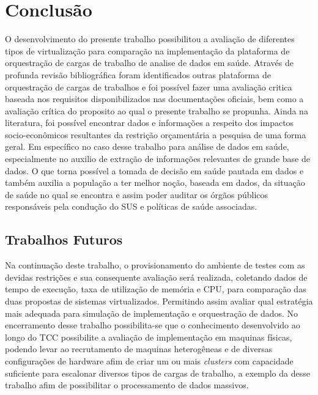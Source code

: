
\chapter{Conclusão}
\label{chap:conclusao}

O desenvolvimento do presente trabalho possibilitou a avaliação de diferentes tipos de virtualização para comparação na implementação da plataforma de orquestração de cargas de trabalho de analise de dados em saúde. Através de profunda revisão bibliográfica foram identificados outras plataforma de orquestração de cargas de trabalhos e foi possível fazer uma avaliação critica baseada nos requisitos disponibilizados nas documentações oficiais, bem como a avaliação crítica do proposito ao qual o presente trabalho se propunha. Ainda na literatura, foi possível encontrar dados e informações a respeito dos impactos socio-econômicos resultantes da restrição orçamentária a pesquisa de uma forma geral. Em específico no caso desse trabalho para análise de dados em saúde, especialmente no auxilio de extração de informações relevantes de grande base de dados. O que torna possível a tomada de decisão em saúde pautada em dados e também auxilia a população a ter melhor noção, baseada em dados, da situação de saúde no qual se encontra e assim poder auditar os órgãos públicos responsáveis pela condução do SUS e políticas de saúde associadas.

\section{Trabalhos Futuros}
\label{sec:trabalhosFuturos}

Na continuação deste trabalho, o provisionamento do ambiente de testes com as devidas restrições e sua consequente avaliação será realizada, coletando dados de tempo de execução, taxa de utilização de memória e CPU, para comparação das duas propostas de sistemas virtualizados. Permitindo assim avaliar qual estratégia mais adequada para simulação de implementação e orquestração de dados.
No encerramento desse trabalho possibilita-se que o conhecimento desenvolvido ao longo do TCC possibilite a avaliação de implementação em maquinas físicas, podendo levar ao recrutamento de maquinas heterogêneas e de diversas configurações de hardware afim de criar um ou mais \emph{clusters} com capacidade suficiente para escalonar diversos tipos de cargas de trabalho, a exemplo da desse trabalho afim de possibilitar o processamento de dados massivos.

